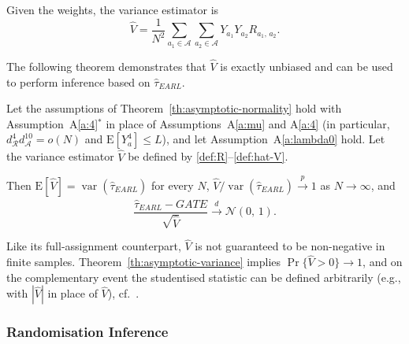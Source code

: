 \documentclass[sigconf,nonacm]{acmart}
\newcounter{assumption}
\newcommand{\E}{\mathrm E}
\DeclareMathOperator{\var}{var}
\begin{document}
Given the weights, the variance estimator is
\begin{equation}\label{def:hat-V}
    \hat V = \frac 1 {N^2} \sum_{a_1\in\mathcal A}\sum_{a_2\in\mathcal A} Y_{a_1}Y_{a_2}R_{a_1,\,a_2}.
\end{equation}

The following theorem demonstrates that $\hat V$ is exactly unbiased and can be used to perform inference based on $\hat\tau_{EARL}^{\phantom{1}}$.

\begin{theorem}\label{th:asymptotic-variance}
    Let the assumptions of Theorem~\ref{th:asymptotic-normality} hold with Assumption~A\ref{a:4}$^*$ in place of Assumptions~A\ref{a:mu} and A\ref{a:4} (in particular, $d^{4}_{\mathcal{R}}d^{10}_{\mathcal{A}}=o(N)$ and $\E[Y_a^4]\le L$), and let Assumption~A\ref{a:lambda0} hold. Let the variance estimator $\hat V$ be defined by \eqref{def:R}--\eqref{def:hat-V}.

    Then $\E[\hat V] = \var(\hat\tau^{\phantom{1}}_{EARL})$ for every $N$, $\hat V / \var(\hat\tau^{\phantom{1}}_{EARL})\stackrel{p}{\to} 1$ as $N\to\infty$, and
    $$
        \frac{\hat\tau^{\phantom{1}}_{EARL} - GATE}{\sqrt{\hat V}} \stackrel{d}{\to} \mathcal N(0,\,1).
    $$
\end{theorem}

Like its full-assignment counterpart, $\hat V$ is not guaranteed to be non-negative in finite samples. Theorem~\ref{th:asymptotic-variance} implies $\Pr\{\hat V>0\}\to1$, and on the complementary event the studentised statistic can be defined arbitrarily (e.g., with $|\hat V|$ in place of $\hat V$), cf.\ \cite{harshaw2023erl}.

\subsubsection{Randomisation Inference}\label{subsubsec:ri}
\end{document}
